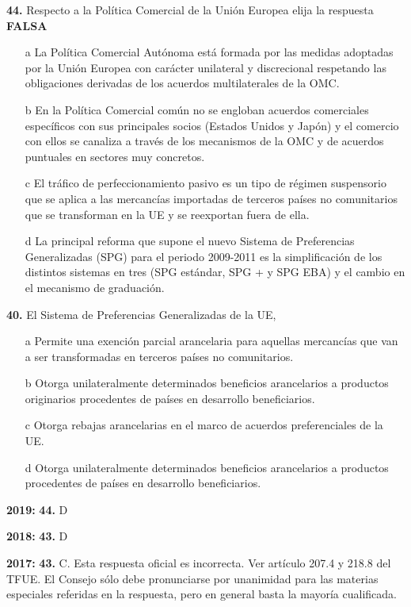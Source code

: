 \documentclass{nuevotema}
\begin{document}
\textbf{44.} Respecto a la Política Comercial de la Unión Europea elija la respuesta \textbf{FALSA}
\begin{itemize}
	\item[a] La Política Comercial Autónoma está formada por las medidas adoptadas por la Unión Europea con carácter unilateral y discrecional respetando las obligaciones derivadas de los acuerdos multilaterales de la OMC.
	\item[b] En la Política Comercial común no se engloban acuerdos comerciales específicos con sus principales socios (Estados Unidos y Japón) y el comercio con ellos se canaliza a través de los mecanismos de la OMC y de acuerdos puntuales en sectores muy concretos.
	\item[c] El tráfico de perfeccionamiento pasivo es un tipo de régimen suspensorio que se aplica a las mercancías importadas de terceros países no comunitarios que se transforman en la UE y se reexportan fuera de ella.
	\item[d] La principal reforma que supone el nuevo Sistema de Preferencias Generalizadas (SPG) para el periodo 2009-2011 es la simplificación de los distintos sistemas en tres (SPG estándar, SPG + y SPG EBA) y el cambio en el mecanismo de graduación.
\end{itemize}

\textbf{40.} El Sistema de Preferencias Generalizadas de la UE,
\begin{itemize}
	\item[a] Permite una exención parcial arancelaria para aquellas mercancías que van a ser transformadas en terceros países no comunitarios.
	\item[b] Otorga unilateralmente determinados beneficios arancelarios a productos originarios procedentes de países en desarrollo beneficiarios.
	\item[c] Otorga rebajas arancelarias en el marco de acuerdos preferenciales de la UE.
	\item[d] Otorga unilateralmente determinados beneficios arancelarios a productos procedentes de países en desarrollo beneficiarios.
\end{itemize}

\notas

\textbf{2019:} \textbf{44.} D

\textbf{2018:} \textbf{43.} D

\textbf{2017:} \textbf{43.} C. Esta respuesta oficial es incorrecta. Ver artículo 207.4 y 218.8 del TFUE. El Consejo sólo debe pronunciarse por unanimidad para las materias especiales referidas en la respuesta, pero en general basta la mayoría cualificada.
\end{document}
